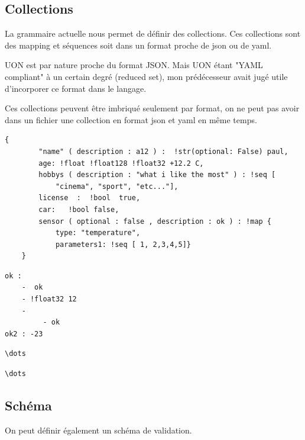\documentclass[
    iict, %
    il, %
]{heig-tb}
\begin{document}
\subsection{Collections}
La grammaire actuelle nous permet de définir des collections. Ces collections sont des mapping et séquences soit dans un format proche de json ou de yaml.

UON est par nature proche du format JSON. Mais UON étant "YAML compliant" à un certain degré (reduced set), mon prédécesseur avait jugé utile d'incorporer ce format
dans le langage.

Ces collections peuvent être imbriqué seulement par format, on ne peut pas avoir dans un fichier une collection en format json et yaml en même temps.

\begin{lstlisting}[frame=single,caption={Exemple d'un mapping en format JSON},captionpos=b,label={json-map}]
    {
        "name" ( description : a12 ) :  !str(optional: False) paul,
        age: !float !float128 !float32 +12.2 C,
        hobbys ( description : "what i like the most" ) : !seq [
            "cinema", "sport", "etc..."],
        license  :  !bool  true,
        car:   !bool false,
        sensor ( optional : false , description : ok ) : !map {
            type: "temperature",
            parameters1: !seq [ 1, 2,3,4,5]}
    }
\end{lstlisting}

\begin{lstlisting}[frame=single,caption={Exemple d'un mapping en format YAML},captionpos=b,label={yaml-map}]
ok :
    -  ok
    - !float32 12
    -
         - ok
ok2 : -23
\end{lstlisting}

\begin{lstlisting}[frame=single,caption={Exemple d'une séquence en format JSON},captionpos=b,label={json-seq}]
\dots
\end{lstlisting}


\begin{lstlisting}[frame=single,caption={Exemple d'une séquence en format YAML},captionpos=b,label={yaml-seq}]
\dots
\end{lstlisting}

\subsection{Schéma}
On peut définir également un schéma de validation.
\end{document}
